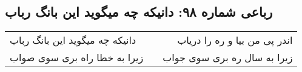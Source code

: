 \begin{center}
\section*{رباعی شماره ۹۸: دانیکه چه میگوید این بانگ رباب}
\label{sec:0098}
\begin{longtable}{l p{0.5cm} r}
دانیکه چه میگوید این بانگ رباب
&&
اندر پی من بیا و ره را دریاب
\\
زیرا به خطا راه بری سوی صواب
&&
زیرا به سال ره بری سوی جواب
\\
\end{longtable}
\end{center}

